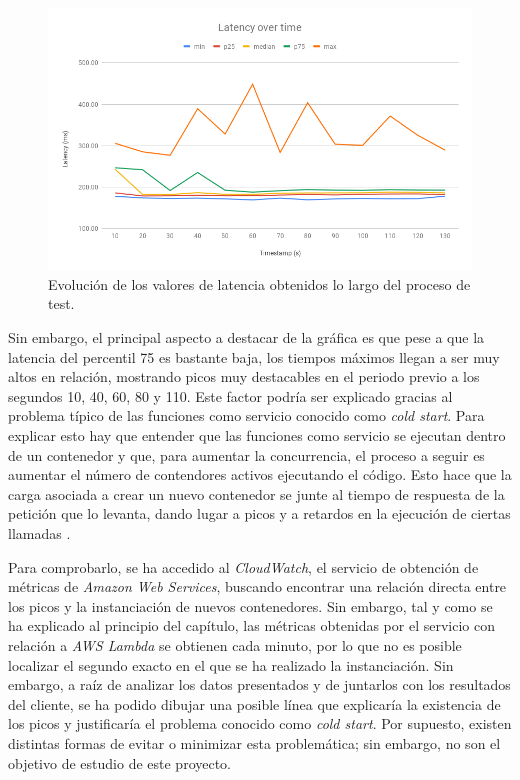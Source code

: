 \documentclass[11pt,spanish,listoffigures]{tfgetsinf}
\begin{document}
\begin{figure}[h!]
    \centering
    \includegraphics[width=1\textwidth]{images/img24.png}
    \caption{Evolución de los valores de latencia obtenidos lo largo del proceso de test.}
    \label{fig:benchmark2}
\end{figure}

Sin embargo, el principal aspecto a destacar de la gráfica es que pese a que la latencia del percentil 75 es bastante baja, los tiempos máximos llegan a ser muy altos en relación, mostrando picos muy destacables en el periodo previo a los segundos 10, 40, 60, 80 y 110. Este factor podría ser explicado gracias al problema típico de las funciones como servicio conocido como \textit{cold start}. Para explicar esto hay que entender que las funciones como servicio se ejecutan dentro de un contenedor y que, para aumentar la concurrencia, el proceso a seguir es aumentar el número de contendores activos ejecutando el código. Esto hace que la carga asociada a crear un nuevo contenedor se junte al tiempo de respuesta de la petición que lo levanta, dando lugar a picos y a retardos en la ejecución de ciertas llamadas \cite{cold-start}.

Para comprobarlo, se ha accedido al \textit{CloudWatch}, el servicio de obtención de métricas de \textit{Amazon Web Services}, buscando encontrar una relación directa entre los picos y la instanciación de nuevos contenedores. Sin embargo, tal y como se ha explicado al principio del capítulo, las métricas obtenidas por el servicio con relación a \textit{AWS Lambda} se obtienen cada minuto, por lo que no es posible localizar el segundo exacto en el que se ha realizado la instanciación. Sin embargo, a raíz de analizar los datos presentados y de juntarlos con los resultados del cliente, se ha podido dibujar una posible línea que explicaría la existencia de los picos y justificaría el problema conocido como \textit{cold start}. Por supuesto, existen distintas formas de evitar o minimizar esta problemática; sin embargo, no son el objetivo de estudio de este proyecto.
\end{document}
